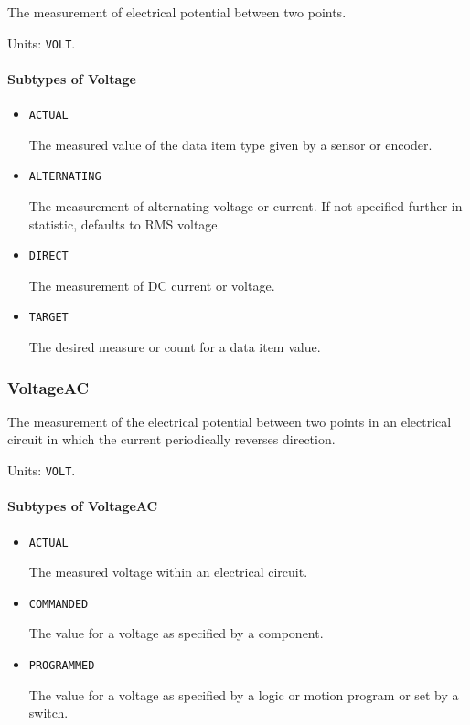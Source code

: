 The measurement of electrical potential between two points.


Units: \texttt{VOLT}.

\paragraph{Subtypes of Voltage}\mbox{}
\label{sec:Subtypes of Voltage}

\begin{itemize}

\item \texttt{ACTUAL}


The measured value of the data item type given by a sensor or encoder.

\item \texttt{ALTERNATING}


The measurement of alternating voltage or current.   If not specified further in statistic, defaults to RMS voltage. 

\item \texttt{DIRECT}


The measurement of DC current or voltage.

\item \texttt{TARGET}


The desired measure or count for a data item value.


\end{itemize}

\subsubsection{VoltageAC}
\label{sec:VoltageAC}



The measurement of the electrical potential between two points in an electrical circuit in which the current periodically reverses direction.


Units: \texttt{VOLT}.

\paragraph{Subtypes of VoltageAC}\mbox{}
\label{sec:Subtypes of VoltageAC}

\begin{itemize}

\item \texttt{ACTUAL}


The measured voltage within an electrical circuit.

\item \texttt{COMMANDED}


The value for a voltage as specified by a  component.

\item \texttt{PROGRAMMED}


The value for a voltage as specified by a logic or motion program or set by a switch.


\end{itemize}

